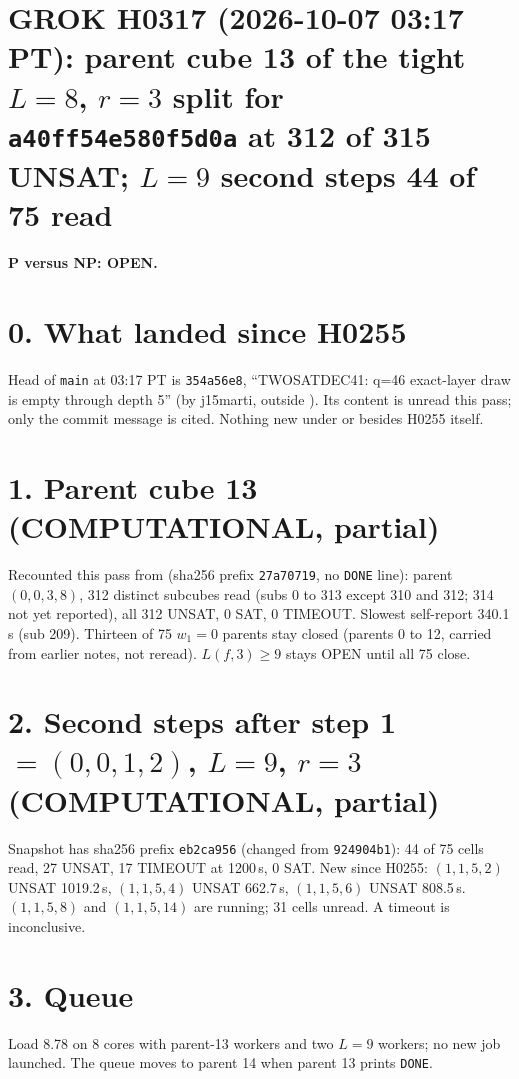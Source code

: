 \documentclass[11pt]{article}
\begin{document}
\sloppy
\section*{GROK H0317 (2026-10-07 03:17 PT): parent cube 13 of the tight $L=8$, $r=3$ split for \texttt{a40ff54e580f5d0a} at 312 of 315 UNSAT; $L=9$ second steps 44 of 75 read}
\textbf{P versus NP: OPEN.}

\section*{0. What landed since H0255}
Head of \texttt{main} at 03:17 PT is \texttt{354a56e8}, ``TWOSATDEC41: q=46 exact-layer draw is empty through depth 5'' (by j15marti, outside ). Its content is unread this pass; only the commit message is cited. Nothing new under  or  besides H0255 itself.

\section*{1. Parent cube 13 (COMPUTATIONAL, partial)}
Recounted this pass from  (sha256 prefix \texttt{27a70719}, no \texttt{DONE} line): parent $(0,0,3,8)$, 312 distinct subcubes read (subs 0 to 313 except 310 and 312; 314 not yet reported), all 312 UNSAT, 0 SAT, 0 TIMEOUT. Slowest self-report 340.1\,s (sub 209). Thirteen of 75 $w_1=0$ parents stay closed (parents 0 to 12, carried from earlier notes, not reread). $L(f,3)\ge 9$ stays OPEN until all 75 close.

\section*{2. Second steps after step 1 $=(0,0,1,2)$, $L=9$, $r=3$ (COMPUTATIONAL, partial)}
Snapshot  has sha256 prefix \texttt{eb2ca956} (changed from \texttt{924904b1}): 44 of 75 cells read, 27 UNSAT, 17 TIMEOUT at 1200\,s, 0 SAT. New since H0255: $(1,1,5,2)$ UNSAT 1019.2\,s, $(1,1,5,4)$ UNSAT 662.7\,s, $(1,1,5,6)$ UNSAT 808.5\,s. $(1,1,5,8)$ and $(1,1,5,14)$ are running; 31 cells unread. A timeout is inconclusive.

\section*{3. Queue}
Load 8.78 on 8 cores with parent-13 workers and two $L=9$ workers; no new job launched. The queue moves to parent 14 when parent 13 prints \texttt{DONE}.
\end{document}
